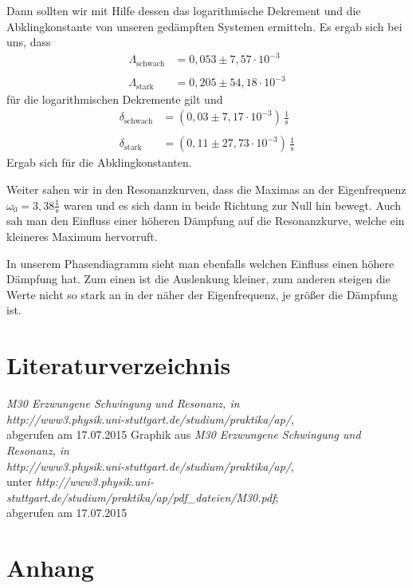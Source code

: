 \documentclass[fontsize=12pt]{scrartcl}
\begin{document}
Dann sollten wir mit Hilfe dessen das logarithmische Dekrement und die Abklingkonstante von unseren gedämpften Systemen ermitteln. Es ergab sich bei uns, dass
\begin{align*}
\Lambda_{\text{schwach}} &= 0,053\pm  7,57 \cdot 10^{-3}\\
~\\
\Lambda_{\text{stark}} &=0,205\pm54,18 \cdot 10^{-3}
\end{align*}
für die logarithmischen Dekremente gilt und 
\begin{align*}
\delta_{\text{schwach}} &=  ( 0,03\pm7,17\cdot 10^{-3}) 			\,\frac{1}{\text{s}}\\
~\\
\delta_{\text{stark}} &= (0,11\pm27,73\cdot 10^{-3}	)	\,\frac{1}{\text{s}}
\end{align*}
Ergab sich für die Abklingkonstanten. \par

Weiter sahen wir in den Resonanzkurven, dass die Maximas an der Eigenfrequenz $\omega_0=3,38\frac{1}{\text{s}}$ waren und es sich dann in beide Richtung zur Null hin bewegt. Auch sah man den Einfluss einer höheren Dämpfung auf die Resonanzkurve, welche ein kleineres Maximum hervorruft. \par

In unserem Phasendiagramm sieht man ebenfalls welchen Einfluss einen höhere Dämpfung hat. Zum einen ist die Auslenkung kleiner, zum anderen steigen die Werte nicht so stark an in der näher der Eigenfrequenz, je größer die Dämpfung ist.
\newpage
\section{Literaturverzeichnis}

\renewcommand{\refname}{~}
\vspace{-30pt}
\begin{thebibliography}{xx}
     	   \textit{\glqq M30 Erzwungene Schwingung und Resonanz\grqq , in 	\\
   								http://www3.physik.uni-stuttgart.de/studium/praktika/ap/}, \\
   								abgerufen am  17.07.2015
     	Graphik aus \textit{\glqq M30 Erzwungene Schwingung und Resonanz\grqq , in 	\\
   								http://www3.physik.uni-stuttgart.de/studium/praktika/ap/}, \\
   								unter \textit{http://www3.physik.uni-stuttgart.de/studium/praktika/ap/pdf\_dateien/M30.pdf}; \\
   								abgerufen am  17.07.2015
\end{thebibliography}

\section{Anhang}
\end{document}
